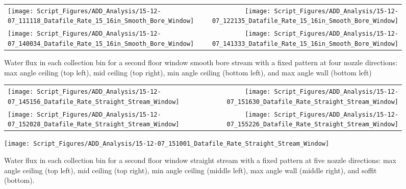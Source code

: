 \documentclass[12pt,oneside]{book}
\begin{document}
\begin{figure}[ht]
\begin{tabular*}{\textwidth}{lr}
\texttt{[image: Script\_Figures/ADD\_Analysis/15-12-07\_111118\_Datafile\_Rate\_15\_16in\_Smooth\_Bore\_Window]} &
\texttt{[image: Script\_Figures/ADD\_Analysis/15-12-07\_122135\_Datafile\_Rate\_15\_16in\_Smooth\_Bore\_Window]} \\
\texttt{[image: Script\_Figures/ADD\_Analysis/15-12-07\_140034\_Datafile\_Rate\_15\_16in\_Smooth\_Bore\_Window]} &
\texttt{[image: Script\_Figures/ADD\_Analysis/15-12-07\_141333\_Datafile\_Rate\_15\_16in\_Smooth\_Bore\_Window]} \\
\end{tabular*}
\caption[Water Flux for Varying Nozzle Direction with Fixed Second Floor Window Smooth Bore Stream]{Water flux in each collection bin for a second floor window smooth bore stream with a fixed pattern at four nozzle directions: max angle ceiling (top left), mid ceiling (top right), min angle ceiling (bottom left), and max angle wall (bottom left)}
\label{fig:Window_Second_Floor_Varying_Nozzle_Directions_SB_Fixed_Pattern}
\end{figure}

\begin{figure}[ht]
\begin{tabular*}{\textwidth}{lr}
\texttt{[image: Script\_Figures/ADD\_Analysis/15-12-07\_145156\_Datafile\_Rate\_Straight\_Stream\_Window]} &
\texttt{[image: Script\_Figures/ADD\_Analysis/15-12-07\_151630\_Datafile\_Rate\_Straight\_Stream\_Window]} \\
\texttt{[image: Script\_Figures/ADD\_Analysis/15-12-07\_152028\_Datafile\_Rate\_Straight\_Stream\_Window]} &
\texttt{[image: Script\_Figures/ADD\_Analysis/15-12-07\_155226\_Datafile\_Rate\_Straight\_Stream\_Window]} \\
\end{tabular*}
\centering
\texttt{[image: Script\_Figures/ADD\_Analysis/15-12-07\_151001\_Datafile\_Rate\_Straight\_Stream\_Window]}
\caption[Water Flux for Varying Nozzle Direction with Fixed Second Floor Window Straight Stream]{Water flux in each collection bin for a second floor window straight stream with a fixed pattern at five nozzle directions: max angle ceiling (top left), mid ceiling (top right), min angle ceiling (middle left), max angle wall (middle right), and soffit (bottom).}
\label{fig:Window_Second_Floor_Varying_Nozzle_Directions_SS_Fixed_Pattern}
\end{figure}
\end{document}
